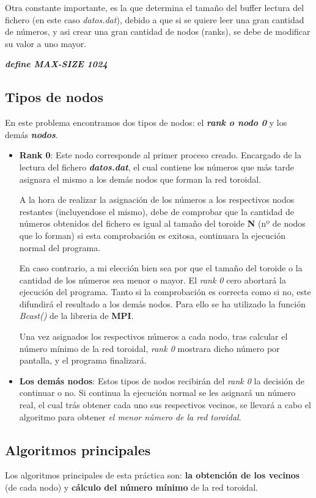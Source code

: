 \documentclass[11pt]{article}
\begin{document}
Otra constante importante, es la que determina el tamaño del buffer lectura del fichero (en este caso \textit{datos.dat}), debido a que si se quiere leer una gran cantidad de números, y asi crear una gran cantidad de nodos (ranks), se debe de modificar su valor a uno mayor.

\textit{\textbf{define MAX-SIZE 1024}}

\subsection{Tipos de nodos}
En este problema encontramos dos tipos de nodos: el \textbf{\textit{rank o nodo 0}} y los demás \textbf{\textit{nodos}}.

\begin{itemize}
	\item \textbf{Rank 0}: Este nodo corresponde al primer proceso creado. Encargado de la lectura del fichero \textit{\textbf{datos.dat}}, el cual contiene los números que más tarde asignara el mismo a los demás nodos que forman la red toroidal.
	
	A la hora de realizar la asignación de los números a los respectivos nodos restantes (incluyendose el mismo), debe de comprobar que la cantidad de números obtenidos del fichero es igual al tamaño del toroide \textbf{N} (nº de nodos que lo forman) si esta comprobación es exitosa, continuara la ejecución normal del programa.
	
	En caso contrario, a mi elección bien sea por que el tamaño del toroide o la cantidad de los números sea menor o mayor. El \textit{rank 0} cero abortará la ejecución del programa. 
	Tanto si la comprobación es correcta como si no, este difundirá el resultado a los demás nodos. Para ello se ha utilizado la función \textit{Bcast()} de la libreria de \textbf{MPI}.
	
	Una vez asignados los respectivos números a cada nodo, tras calcular el número mínimo de la red toroidal, \textit{rank 0} mostrara dicho número por pantalla, y el programa finalizará.
	
	\item \textbf{Los demás nodos}: Estos tipos de nodos recibirán del \textit{rank 0} la decisión de continuar o no. Si continua la ejecución normal se les asignará un número real, el cual trás obtener cada uno sus respectivos vecinos, se  llevará a cabo el algoritmo para obtener \textit{el menor número de la red toroidal}.
\end{itemize}


\subsection{Algoritmos principales}
Los algoritmos principales de esta práctica son: \textbf{la obtención de los vecinos} (de cada nodo) y \textbf{cálculo del número mínimo} de la red toroidal.
\end{document}

